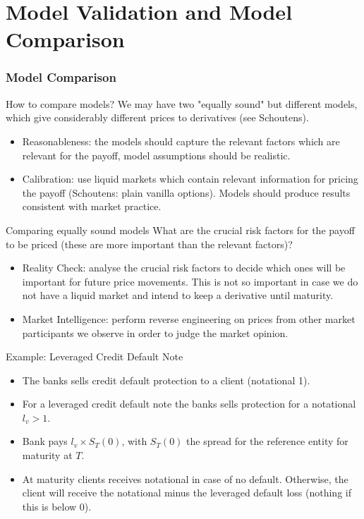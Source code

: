 
\part{Model Validation and Model Comparison}                          %


\section{Model Comparison}

{How to compare models?}
We may have two "equally sound" but different models, which give considerably different prices to derivatives (see Schoutens).

\begin{itemize}
\item<1-> Reasonableness: the models should capture the relevant factors which are relevant for the payoff, model assumptions should be realistic.
\item<2-> Calibration: use liquid markets which contain relevant information for pricing the payoff (Schoutens: plain vanilla options). Models should produce results consistent with market practice.
\end{itemize}





{Comparing equally sound models}
What are the crucial risk factors for the payoff to be priced (these are more important than the relevant factors)?
\begin{itemize}
\item<1-> Reality Check: analyse the crucial risk factors to decide which ones will be important for future price movements. This is not so important in case we do not have a liquid market and intend to keep a derivative until maturity.
\item<2-> Market Intelligence: perform reverse engineering on prices from other market participants we observe in order to judge the market opinion.
\end{itemize}


{Example: Leveraged Credit Default Note}
\begin{itemize}
\item<1-> The banks sells credit default protection to a client (notational 1).
\item<2-> For a leveraged credit default note the banks sells protection for a notational $l_v>1$.
\item<3-> Bank pays $l_v \times S_T(0)$, with $S_T(0)$ the spread for the reference entity for maturity at $T$.
\item<4-> At maturity clients receives notational in case of no default. Otherwise, the client will receive the notational minus the leveraged default loss (nothing if this is below 0).
\end{itemize}





